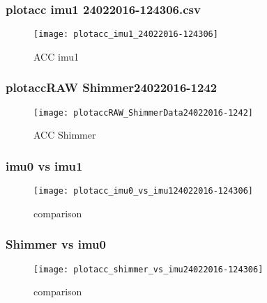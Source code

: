 \documentclass{beamer}
\begin{document}
\begin{frame}
\frametitle{plotacc imu1 24022016-124306.csv}
\vspace{-7mm}

\begin{figure}[!htb]
\centering    
\texttt{[image: plotacc\_imu1\_24022016-124306]}
\caption[PA]{ACC imu1}
\label{}
\end{figure}

\end{frame}
 
 
 


\begin{frame}
\frametitle{plotaccRAW Shimmer24022016-1242}
\vspace{-7mm}

\begin{figure}[!htb]
\centering    
\texttt{[image: plotaccRAW\_ShimmerData24022016-1242]}
\caption[PA]{ACC Shimmer}
\label{}
\end{figure}

\end{frame}




\begin{frame}
\frametitle{ imu0 vs imu1 }
\vspace{-7mm}

\begin{figure}[!htb]
\centering    
\texttt{[image: plotacc\_imu0\_vs\_imu124022016-124306]}
\caption[PA]{comparison}
\label{}
\end{figure}

\end{frame}




\begin{frame}
\frametitle{ Shimmer vs imu0 }
\vspace{-7mm}

\begin{figure}[!htb]
\centering    
\texttt{[image: plotacc\_shimmer\_vs\_imu24022016-124306]}
\caption[PA]{comparison}
\label{}
\end{figure}

\end{frame}
\end{document}
